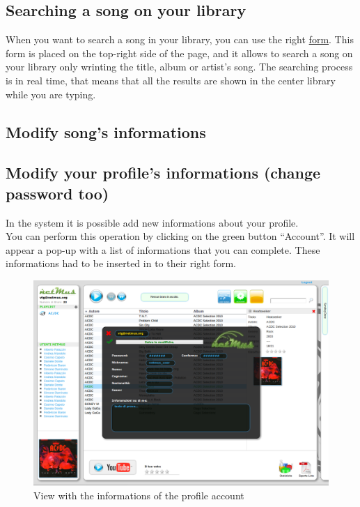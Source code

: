 \subsection*{Searching a song on your library}

When you want to search a song in your library, you can use the right \underline{form}. This
form is placed on the top-right side of the page, and it allows to search a song
on your library only wrinting the title, album or artist's song. The searching
process is in real time, that means that all the results are shown in the center
library while you are typing.


\subsection*{Modify song's informations}

\subsection*{Modify your profile's informations (change password too)}

In the  system it is possible add new informations about your
profile.\\
You can perform this operation by clicking on the green button ``Account''. It
will appear a pop-up with a list of informations that you can complete. These
informations had to be inserted in to their right form.

\begin{figure}[htbp]
  \centering
  \includegraphics[width=15cm]{img/MU/profile_view.png}
\caption{View with the informations of the profile account}
\end{figure}

